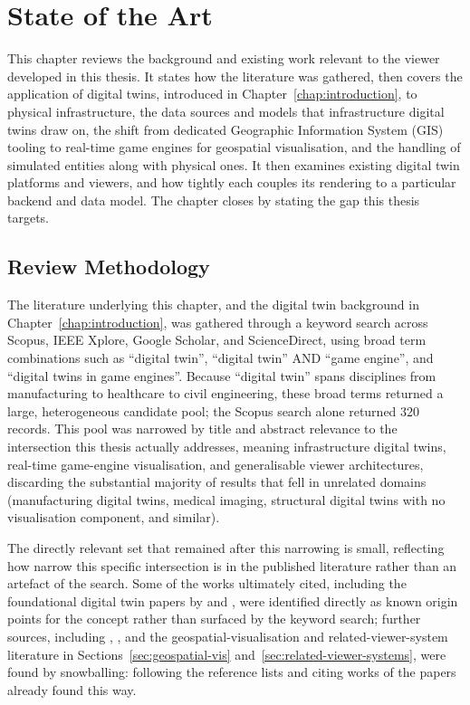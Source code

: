 \chapter{State of the Art}
\label{chap:state-of-the-art}

\begin{introduction}
This chapter reviews the background and existing work relevant to the viewer developed in this thesis. It states how the literature was gathered, then covers the application of digital twins, introduced in Chapter~\ref{chap:introduction}, to physical infrastructure, the data sources and models that infrastructure digital twins draw on, the shift from dedicated Geographic Information System (GIS) tooling to real-time game engines for geospatial visualisation, and the handling of simulated entities along with physical ones. It then examines existing digital twin platforms and viewers, and how tightly each couples its rendering to a particular backend and data model. The chapter closes by stating the gap this thesis targets.
\end{introduction}

\section{Review Methodology}
\label{sec:review-methodology}

The literature underlying this chapter, and the digital twin background in Chapter~\ref{chap:introduction}, was gathered through a keyword search across Scopus, IEEE Xplore, Google Scholar, and ScienceDirect, using broad term combinations such as ``digital twin'', ``digital twin'' AND ``game engine'', and ``digital twins in game engines''. Because ``digital twin'' spans disciplines from manufacturing to healthcare to civil engineering, these broad terms returned a large, heterogeneous candidate pool; the Scopus search alone returned 320 records. This pool was narrowed by title and abstract relevance to the intersection this thesis actually addresses, meaning infrastructure digital twins, real-time game-engine visualisation, and generalisable viewer architectures, discarding the substantial majority of results that fell in unrelated domains (manufacturing digital twins, medical imaging, structural digital twins with no visualisation component, and similar).

The directly relevant set that remained after this narrowing is small, reflecting how narrow this specific intersection is in the published literature rather than an artefact of the search. Some of the works ultimately cited, including the foundational digital twin papers by \textcite{grieves2016digitaltwin} and \textcite{glaessgen2012digitaltwin}, were identified directly as known origin points for the concept rather than surfaced by the keyword search; further sources, including \textcite{broo2021digitaltwins}, \textcite{kherbache2022ditto}, and the geospatial-visualisation and related-viewer-system literature in Sections~\ref{sec:geospatial-vis} and~\ref{sec:related-viewer-systems}, were found by snowballing: following the reference lists and citing works of the papers already found this way.

